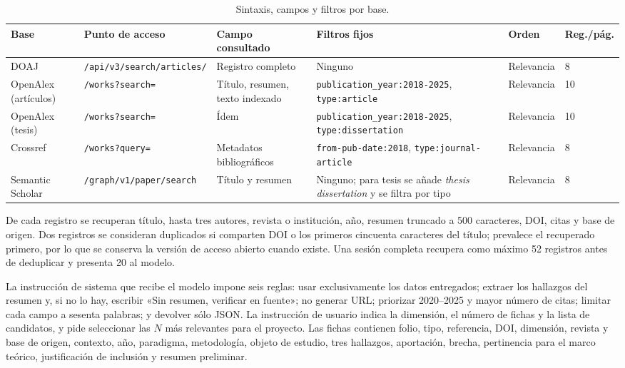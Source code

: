 \begin{table}[htbp]\centering\scriptsize
\caption{Sintaxis, campos y filtros por base.}
\label{tab:sintaxis}
\begin{tabular}{@{}p{2.2cm}p{3.2cm}p{3.0cm}p{3.3cm}p{1.6cm}p{0.9cm}@{}}
\toprule
Base & Punto de acceso & Campo consultado & Filtros fijos & Orden & Reg./pág. \\
\midrule
DOAJ & \texttt{/api/v3/search/articles/} & Registro completo & Ninguno & Relevancia & 8 \\
OpenAlex (artículos) & \texttt{/works?search=} & Título, resumen, texto indexado & \texttt{publication\_year:2018-2025}, \texttt{type:article} & Relevancia & 10 \\
OpenAlex (tesis) & \texttt{/works?search=} & Ídem & \texttt{publication\_year:2018-2025}, \texttt{type:dissertation} & Relevancia & 10 \\
Crossref & \texttt{/works?query=} & Metadatos bibliográficos & \texttt{from-pub-date:2018}, \texttt{type:journal-article} & Relevancia & 8 \\
Semantic Scholar & \texttt{/graph/v1/paper/search} & Título y resumen & Ninguno; para tesis se añade \emph{thesis dissertation} y se filtra por tipo & Relevancia & 8 \\
\bottomrule
\end{tabular}
\end{table}

De cada registro se recuperan título, hasta tres autores, revista o
institución, año, resumen truncado a 500 caracteres, DOI, citas y base de
origen. Dos registros se consideran duplicados si comparten DOI o los
primeros cincuenta caracteres del título; prevalece el recuperado primero, por
lo que se conserva la versión de acceso abierto cuando existe. Una sesión
completa recupera como máximo 52 registros antes de deduplicar y presenta 20
al modelo.

La instrucción de sistema que recibe el modelo impone seis reglas: usar
exclusivamente los datos entregados; extraer los hallazgos del resumen y, si
no lo hay, escribir «Sin resumen, verificar en fuente»; no generar URL;
priorizar 2020--2025 y mayor número de citas; limitar cada campo a sesenta
palabras; y devolver sólo JSON. La instrucción de usuario indica la
dimensión, el número de fichas y la lista de candidatos, y pide seleccionar
las $N$ más relevantes para el proyecto. Las fichas contienen folio, tipo,
referencia, DOI, dimensión, revista y base de origen, contexto, año,
paradigma, metodología, objeto de estudio, tres hallazgos, aportación,
brecha, pertinencia para el marco teórico, justificación de inclusión y
resumen preliminar.

